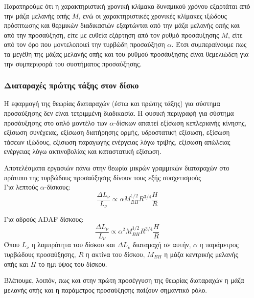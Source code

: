 Παρατηρούμε ότι η χαρακτηριστική χρονική κλίμακα δυναμικού χρόνου εξαρτάται από την μάζα μελανής οπής $M$, ενώ οι χαρακτηριστικές χρονικές κλίμακες ιξώδους πρόσπτωσης και θερμικών διαδικασιών εξαρτώνται από την μάζα μελανής οπής και από την προσαύξηση, είτε με ευθεία εξάρτηση από τον ρυθμό προσάυξησης $\dot M$, είτε από τον όρο που μοντελοποιεί την τυρβώδη προσαύξηση  $\alpha$. Έτσι συμπεραίνουμε πως τα μεγέθη της μάζας μελανής οπής και του ρυθμού προσάυξησης είναι θεμελιώδεη για την συμπεριφορά του συστήματος προσαύξησης. 

\subsubsection*{Διαταραχές πρώτης τάξης στον δίσκο}

Η εφαρμογή της θεωρίας διαταραχών (έστω και πρώτης τάξης) για σύστημα προσαύξησης δεν είναι τετριμμένη διαδικασία. Η φυσική περιγραφή για σύστημα προσάυξησης στο απλό μοντέλο των $\alpha$-δίσκων απαιτεί\cite{ShakuraInstability} εξίσωση κεπλεριανής κίνησης, εξίσωση συνέχειας, εξίσωση διατήρησης ορμής, υδροστατική εξίσωση, εξίσωση τάσεων ιξώδους, εξίσωση παραγωγής ενέργειας λόγω τριβής, εξίσωση απώλειας ενέργειας λόγω ακτινοβολίας και καταστατική εξίσωση.

Αποτελέσματα εργασιών πάνω στην θεωρία μικρών γραμμικών διαταραχών στο πρότυπο της τυρβώδους προσαύξησης δίνουν τους εξής συσχετισμούς\cite{Blackman98} \\
Για λεπτούς $\alpha$-δίσκους:\\
\begin{equation}
    \frac{\Delta L_\nu}{L_\nu} \propto \alpha M_{BH}^{1/2} R^{3/4} \frac{H}{R}
\end{equation}

Για αδρούς \textlatin{ADAF} δίσκους:\\
\begin{equation}
    \frac{\Delta L_\nu}{L_\nu} \propto \alpha^2 M_{BH}^{1/2} R^{3/4} \frac{H}{R}
\end{equation}
Όπου $L_\nu$ η λαμπρότητα του δίσκου και $\Delta L_\nu$ διαταραχή σε αυτήν, $\alpha$ η παράμετρος τυρβώδους προσαύξησης, $R$ η ακτίνα του δίσκου, $M_{BH}$ η μάζα κεντρικής μελανής οπής και $H$ το ημι-ύψος του δίσκου.

Βλέπουμε, λοιπόν, πως και στην πρώτη προσέγγυση της θεωρίας διαταραχών η μάζα μελανής οπής και η παράμετρος προσαύξησης παίζουν σημαντικό ρόλο.





